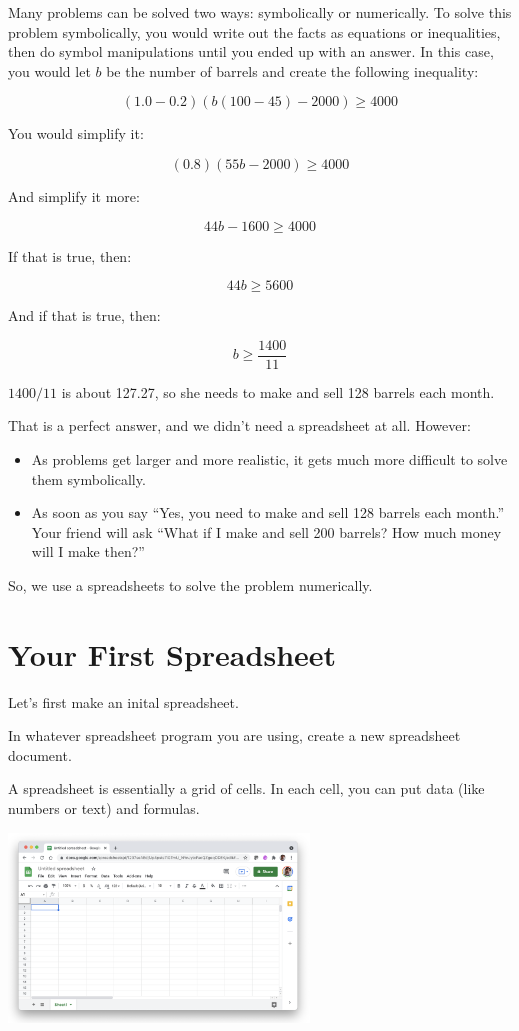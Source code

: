 Many problems can be solved two ways: symbolically or
numerically. To solve this
problem symbolically, you would write out the facts as equations or
inequalities, then do symbol manipulations until you ended up with
an answer. In this case, you would let $b$ be the number of barrels
and create the following inequality:

$$(1.0 - 0.2)\left(b(100 - 45) - 2000\right) \geq 4000$$

You would simplify it:

$$(0.8)\left(55 b - 2000\right) \geq 4000$$

And simplify it more:

$$44b - 1600 \geq 4000$$

If that is true, then:

$$44b \geq 5600$$

And if that is true, then:

$$b \geq \frac{1400}{11}$$

$1400/11$ is about 127.27, so she needs to make and sell 128 barrels
each month.

That is a perfect answer, and we didn't need a spreadsheet at all. However:
\begin{itemize}
\item As problems get larger and more realistic, it gets much more difficult to solve them symbolically.
\item As soon as you say ``Yes, you need to make and sell 128 barrels
  each month.'' Your friend will ask ``What if I make and sell 200
  barrels? How much money will I make then?''
\end{itemize}

So, we use a spreadsheets to solve the problem numerically.


\section{Your First Spreadsheet}

Let's first make an inital spreadsheet. 

In whatever spreadsheet program you are using, create a new spreadsheet document.

A spreadsheet is essentially a grid of cells. In each cell, you can put data (like numbers or text) and formulas.

\includegraphics[width=0.6\textwidth]{BlankSheet.png}

